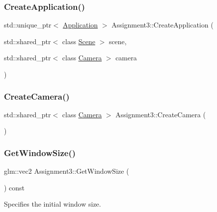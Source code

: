 \subsubsection{\texorpdfstring{Create\+Application()}{CreateApplication()}}
{\footnotesize\ttfamily std\+::unique\+\_\+ptr$<$ \hyperlink{class_application}{Application} $>$ Assignment3\+::\+Create\+Application (\begin{DoxyParamCaption}\item[{std\+::shared\+\_\+ptr$<$ class \hyperlink{class_scene}{Scene} $>$}]{scene,  }\item[{std\+::shared\+\_\+ptr$<$ class \hyperlink{class_camera}{Camera} $>$}]{camera }\end{DoxyParamCaption})\hspace{0.3cm}{\ttfamily [static]}}

\hypertarget{class_assignment3_a47d1b58079eee3e135e08768cd2a2461}{}\label{class_assignment3_a47d1b58079eee3e135e08768cd2a2461} 
\subsubsection{\texorpdfstring{Create\+Camera()}{CreateCamera()}}
{\footnotesize\ttfamily std\+::shared\+\_\+ptr$<$ class \hyperlink{class_camera}{Camera} $>$ Assignment3\+::\+Create\+Camera (\begin{DoxyParamCaption}{ }\end{DoxyParamCaption})\hspace{0.3cm}{\ttfamily [static]}}

\hypertarget{class_assignment3_aec48ba5500d906963fdac555ee47cb72}{}\label{class_assignment3_aec48ba5500d906963fdac555ee47cb72} 
\subsubsection{\texorpdfstring{Get\+Window\+Size()}{GetWindowSize()}}
{\footnotesize\ttfamily glm\+::vec2 Assignment3\+::\+Get\+Window\+Size (\begin{DoxyParamCaption}{ }\end{DoxyParamCaption}) const\hspace{0.3cm}{\ttfamily [virtual]}}



Specifies the initial window size. 

